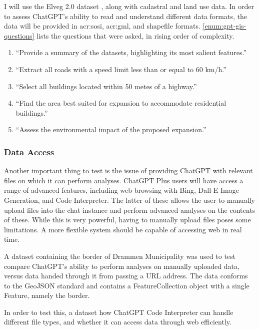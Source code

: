 I will use the Elveg 2.0 dataset \citep{thenorwegianmappingauthorityElveg2019}, along with cadastral and land use data. In order to assess ChatGPT's ability to read and understand different data formats, the data will be provided in \acrshort{acr:sosi}, \acrshort{acr:gml}, and shapefile formats. \autoref{enum:gpt-gis-questions} lists the questions that were asked, in rising order of complexity.

\begin{enumerate}
    \item \enquote{Provide a summary of the datasets, highlighting its most salient features.}
    \item \enquote{Extract all roads with a speed limit less than or equal to 60 km/h.}
    \item \enquote{Select all buildings located within 50 metes of a highway.}
    \item \enquote{Find the area best suited for expansion to accommodate residential buildings.}
    \item \enquote{Assess the environmental impact of the proposed expansion.}
\end{enumerate}
\label{enum:gpt-gis-questions}

\subsubsection{Data Access}

Another important thing to test is the issue of providing ChatGPT with relevant files on which it can perform analyses. ChatGPT Plus users will have access a range of advanced features, including web browsing with Bing, Dall-E Image Generation, and Code Interpreter. The latter of these allows the user to manually upload files into the chat instance and perform advanced analyses on the contents of these. While this is very powerful, having to manually upload files poses some limitations. A more flexible system should be capable of accessing web  in real time.

A dataset containing the border of Drammen Municipality was used to test compare ChatGPT's ability to perform analyses on manually uploaded data, versus data handed through it from passing a URL address. The data conforms to the GeoJSON standard and contains a FeatureCollection object with a single Feature, namely the border.

In order to test this, a dataset  how ChatGPT Code Interpreter can handle different file types, and whether it can access data through web  efficiently.

